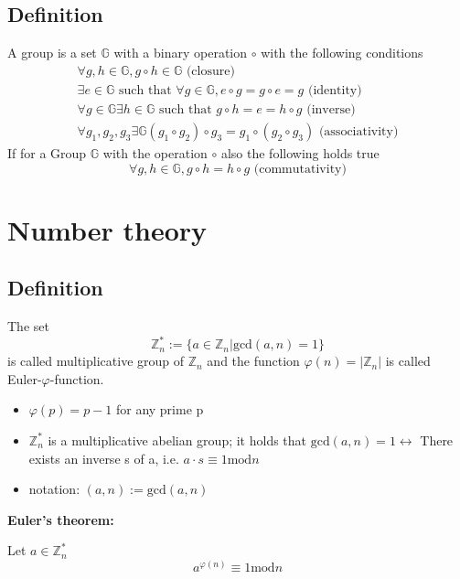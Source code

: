 \documentclass[a4paper]{article}
\begin{document}
\subsection{Definition}
A group is a set $\mathbb{G}$ with a binary operation $\circ$ with the following conditions
\begin{equation}
    \begin{split}
	\forall g,h \in \mathbb{G}, g \circ h \in \mathbb{G} \text{ (closure)}\\
	\exists e \in \mathbb{G} \text{ such that } \forall g \in \mathbb{G}, e \circ g = g \circ e = g \text{ (identity)} \\
	\forall g \in \mathbb{G} \exists h \in \mathbb{G} \text{ such that } g \circ h = e = h \circ g \text{ (inverse)}\\
	\forall g_1,g_2,g_3 \exists \mathbb{G} (g_1 \circ g_2) \circ g_3 = g_1 \circ (g_2 \circ g_3) \text{ (associativity)}
    \end{split}
    \label{group_definition}
\end{equation}
If for a Group $\mathbb{G}$ with the operation $\circ$ also the following holds true 
\begin{equation}
    \forall g,h \in \mathbb{G}, g \circ h = h \circ g \text{ (commutativity)}
    \label{group_abelian_defintion}
\end{equation}
\section{Number theory}
\subsection{Definition}
The set \[\mathbb{Z}_n^* := \{a \in \mathbb{Z}_n | \text{gcd}(a,n) = 1\}\] is called multiplicative group of $\mathbb{Z}_n$ and the function $\varphi(n) = |\mathbb{Z}_n|$ is called Euler-$\varphi$-function.
\begin{itemize}
	\item $\varphi(p) = p-1$ for any prime p
	\item $\mathbb{Z}_n^*$ is a multiplicative abelian group; it holds that $\text{gcd}(a,n) = 1 \leftrightarrow $ There exists an inverse s of a, i.e. $a \cdot s \equiv 1 \text{mod} n$
	\item notation: $(a,n) := \text{gcd}(a,n)$
\end{itemize}

\textbf{Euler's theorem:}

Let $a \in \mathbb{Z}_n^*$
\[ a^{\varphi(n)} \equiv 1 \text{mod} n  \]
\end{document}
